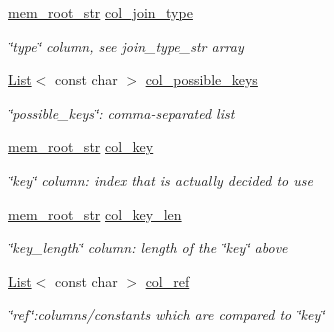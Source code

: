 \begin{DoxyCompactItemize}
\mbox{\hyperlink{structqep__row_1_1mem__root__str}{mem\+\_\+root\+\_\+str}} \mbox{\hyperlink{classqep__row_a3b10c9f93de3ed8d2c0ddfae96780fd0}{col\+\_\+join\+\_\+type}}
\begin{DoxyCompactList}\small\item\em \char`\"{}type\char`\"{} column, see join\+\_\+type\+\_\+str array \end{DoxyCompactList}\item 
\mbox{\label{classqep__row_a2d37de2126f556c525c4db76d1583845}} 
\mbox{\hyperlink{classList}{List}}$<$ const char $>$ \mbox{\hyperlink{classqep__row_a2d37de2126f556c525c4db76d1583845}{col\+\_\+possible\+\_\+keys}}
\begin{DoxyCompactList}\small\item\em \char`\"{}possible\+\_\+keys\char`\"{}\+: comma-\/separated list \end{DoxyCompactList}\item 
\mbox{\label{classqep__row_a8eeb0940b231d965f6e5e90d550dacb0}} 
\mbox{\hyperlink{structqep__row_1_1mem__root__str}{mem\+\_\+root\+\_\+str}} \mbox{\hyperlink{classqep__row_a8eeb0940b231d965f6e5e90d550dacb0}{col\+\_\+key}}
\begin{DoxyCompactList}\small\item\em \char`\"{}key\char`\"{} column\+: index that is actually decided to use \end{DoxyCompactList}\item 
\mbox{\label{classqep__row_a44f5e34bbfa9b2d29f7bf5d409846666}} 
\mbox{\hyperlink{structqep__row_1_1mem__root__str}{mem\+\_\+root\+\_\+str}} \mbox{\hyperlink{classqep__row_a44f5e34bbfa9b2d29f7bf5d409846666}{col\+\_\+key\+\_\+len}}
\begin{DoxyCompactList}\small\item\em \char`\"{}key\+\_\+length\char`\"{} column\+: length of the \char`\"{}key\char`\"{} above \end{DoxyCompactList}\item 
\mbox{\label{classqep__row_a7f683083ee07d8fa222aea174025aa3f}} 
\mbox{\hyperlink{classList}{List}}$<$ const char $>$ \mbox{\hyperlink{classqep__row_a7f683083ee07d8fa222aea174025aa3f}{col\+\_\+ref}}
\begin{DoxyCompactList}\small\item\em \char`\"{}ref\char`\"{}\+:columns/constants which are compared to \char`\"{}key\char`\"{} \end{DoxyCompactList}\item 

\end{DoxyCompactItemize}
